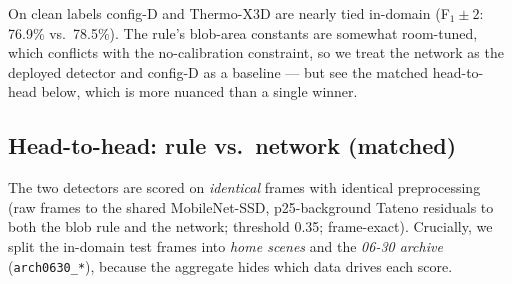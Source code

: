 \documentclass[11pt]{article}
\newcommand{\code}[1]{\texttt{\small #1}}
\begin{document}
On clean labels config-D and Thermo-X3D are nearly tied in-domain
(F$_1{\pm}2$: 76.9\% vs.\ 78.5\%). The rule's blob-area constants are
somewhat room-tuned, which conflicts with the no-calibration constraint,
so we treat the network as the deployed detector and config-D as a
baseline --- but see the matched head-to-head below, which is more nuanced
than a single winner.

\subsection{Head-to-head: rule vs.\ network (matched)}
\label{sec:contact-headtohead}

The two detectors are scored on \emph{identical} frames with identical
preprocessing (raw frames to the shared MobileNet-SSD, p25-background
Tateno residuals to both the blob rule and the network; threshold 0.35;
frame-exact). Crucially, we split the in-domain test frames into
\emph{home scenes} and the \emph{06-30 archive} (\code{arch0630\_*}), because
the aggregate hides which data drives each score.
\end{document}
